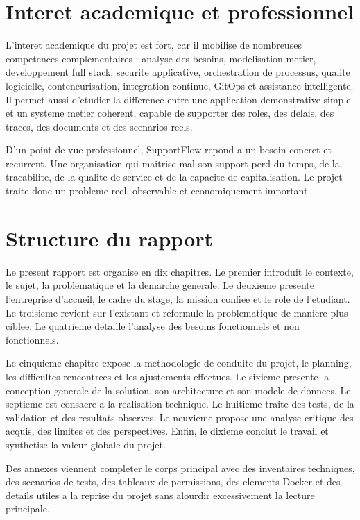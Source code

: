 \section{Interet academique et professionnel}

L'interet academique du projet est fort, car il mobilise de nombreuses competences complementaires : analyse des besoins, modelisation metier, developpement full stack, securite applicative, orchestration de processus, qualite logicielle, conteneurisation, integration continue, GitOps et assistance intelligente. Il permet aussi d'etudier la difference entre une application demonstrative simple et un systeme metier coherent, capable de supporter des roles, des delais, des traces, des documents et des scenarios reels.

D'un point de vue professionnel, SupportFlow repond a un besoin concret et recurrent. Une organisation qui maitrise mal son support perd du temps, de la tracabilite, de la qualite de service et de la capacite de capitalisation. Le projet traite donc un probleme reel, observable et economiquement important.

\section{Structure du rapport}

Le present rapport est organise en dix chapitres. Le premier introduit le contexte, le sujet, la problematique et la demarche generale. Le deuxieme presente l'entreprise d'accueil, le cadre du stage, la mission confiee et le role de l'etudiant. Le troisieme revient sur l'existant et reformule la problematique de maniere plus ciblee. Le quatrieme detaille l'analyse des besoins fonctionnels et non fonctionnels.

Le cinquieme chapitre expose la methodologie de conduite du projet, le planning, les difficultes rencontrees et les ajustements effectues. Le sixieme presente la conception generale de la solution, son architecture et son modele de donnees. Le septieme est consacre a la realisation technique. Le huitieme traite des tests, de la validation et des resultats observes. Le neuvieme propose une analyse critique des acquis, des limites et des perspectives. Enfin, le dixieme conclut le travail et synthetise la valeur globale du projet.

Des annexes viennent completer le corps principal avec des inventaires techniques, des scenarios de tests, des tableaux de permissions, des elements Docker et des details utiles a la reprise du projet sans alourdir excessivement la lecture principale.
